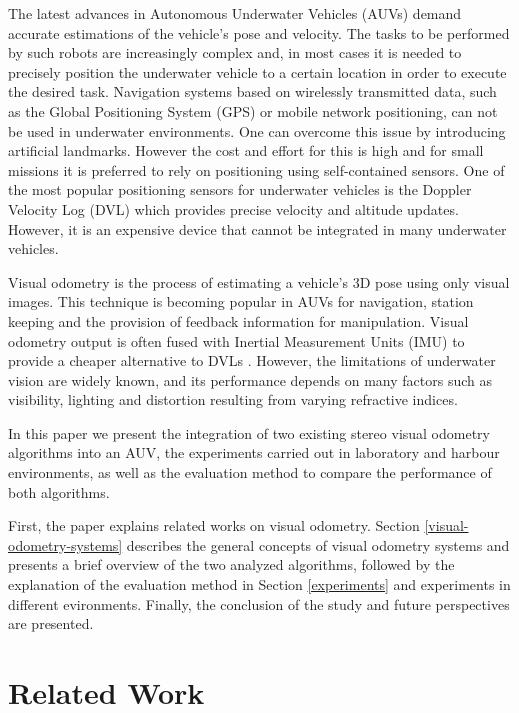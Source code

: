 \documentclass[conference]{IEEEtran}
\begin{document}
The latest advances in Autonomous Underwater Vehicles (AUVs) demand accurate estimations of the vehicle's pose and velocity. The tasks to be performed by such robots are increasingly complex and, in most cases it is needed to precisely position the underwater vehicle to a certain location in order to execute the desired task. Navigation systems based on wirelessly transmitted data, such as the Global Positioning System (GPS) or mobile network positioning, can not be used in underwater environments. One can overcome this issue by introducing artificial landmarks. However the cost and effort for this is high and for small missions it is preferred to rely on positioning using self-contained sensors. One of the most popular positioning sensors for underwater vehicles is the Doppler Velocity Log (DVL) which provides precise velocity and altitude updates. However, it is an expensive device that cannot be integrated in many underwater vehicles.

Visual odometry is the process of estimating a vehicle's 3D pose using only visual images. This technique is becoming popular in AUVs for navigation, station keeping and the provision of feedback information for manipulation. Visual odometry output is often fused with Inertial Measurement Units (IMU) to provide a cheaper alternative to DVLs \cite{Hildebrandt2010,Dunbabin2004}. However, the limitations of underwater vision are widely known, and its performance depends on many factors such as visibility, lighting and distortion resulting from varying refractive indices.

In this paper we present the integration of two existing stereo visual odometry algorithms into an AUV, the experiments carried out in laboratory and harbour environments, as well as the evaluation method to compare the performance of both algorithms.

First, the paper explains related works on visual odometry. Section \ref{visual-odometry-systems} describes the general concepts of visual odometry systems and presents a brief overview of the two analyzed algorithms, followed by the explanation of the evaluation method in Section \ref{experiments} and experiments in different evironments. Finally, the conclusion of the study and future perspectives are presented.

\section{Related Work 
  \label{related-work}
}
\end{document}
